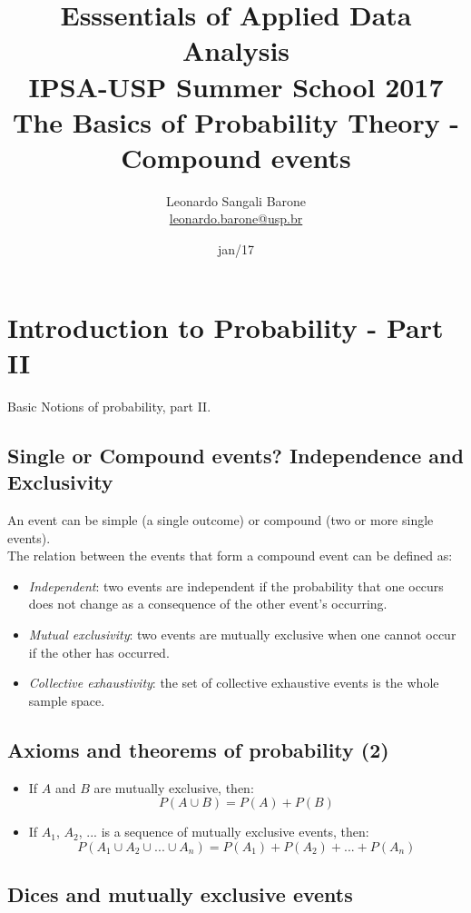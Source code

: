 \documentclass[11pt]{article}
\title{\textbf{Esssentials of Applied Data Analysis\\
				IPSA-USP Summer School 2017}\newline\\
				The Basics of Probability Theory - Compound events}
\author{Leonardo Sangali Barone\\ \href{leonardo.barone@usp.br}{leonardo.barone@usp.br}}
\date{jan/17}
\begin{document}
\maketitle

\section*{Introduction to Probability - Part II}

	Basic Notions of probability, part II.

	\subsection*{Single or Compound events? Independence and Exclusivity}

	An event can be simple (a single outcome) or compound (two or more single events).\\

	The relation between the events that form a compound event can be defined as:
	
	\begin{itemize}
		\item \emph{Independent}: two events are independent if the probability that one occurs does not change as a consequence of the other event’s occurring.
		\item \emph{Mutual exclusivity}: two events are mutually exclusive when one cannot occur if the  other has occurred.
		\item \emph{Collective exhaustivity}: the set of collective exhaustive events is the whole sample space.
	\end {itemize}


	\subsection*{Axioms and theorems of probability (2)}
	\begin{itemize}
		\item  If $A$ and $B$ are mutually exclusive, then:
	\[P(A \cup B) = P(A) + P (B)\]
		\item  If $A_1$, $A_2$, ... is a sequence of mutually exclusive events, then:
	\[P(A_1 \cup A_2 \cup ... \cup A_n) = P(A_1) + P (A_2) + ... + P(A_n)\]
	\end{itemize}


	\subsection*{Dices and mutually exclusive events}
\end{document}
